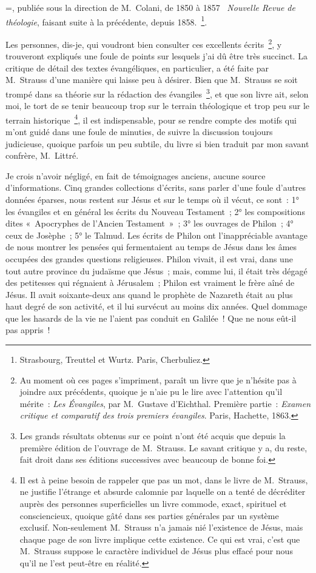 \documentclass[french,twoside]{book} %
\newcommand{\biblitem}[1]{{\noindent\hangindent=\parindent   #1\par}}
\begin{document}
\biblitem{{\itshape Revue de théologie et de philosophie chrétienne}, publiée sous la direction de M. Colani, de 1850 à 1857  {\itshape Nouvelle Revue de théologie}, faisant suite à la précédente, depuis 1858. \footnote{Strasbourg, Treuttel et Wurtz. Paris, Cherbuliez.}.}
\noindent Les personnes, dis-je, qui voudront bien consulter ces excellents écrits \footnote{ Au moment où ces pages s’impriment, paraît un livre que je n’hésite pas à joindre aux précédents, quoique je n’aie pu le lire avec l’attention qu’il mérite : {\itshape Les Évangiles}, par M. Gustave d’Eichthal. Première partie : {\itshape Examen critique et comparatif des trois premiers évangiles}. Paris, Hachette, 1863.}, y trouveront expliqués une foule de points sur lesquels j’ai dû être très succinct. La critique de détail des textes évangéliques, en particulier, a été faite par M. Strauss d’une manière qui laisse peu à désirer. Bien que M. Strauss se soit trompé dans sa théorie sur la rédaction des évangiles \footnote{Les grands résultats obtenus sur ce point n’ont été acquis que depuis la première édition de l’ouvrage de M. Strauss. Le savant critique y a, du reste, fait droit dans ses éditions successives avec beaucoup de bonne foi.}, et que son livre ait, selon moi, le tort de se tenir beaucoup trop sur le terrain théologique et trop peu sur le terrain historique \footnote{Il est à peine besoin de rappeler que pas un mot, dans le livre de M. Strauss, ne justifie l’étrange et absurde calomnie par laquelle on a tenté de décréditer auprès des personnes superficielles un livre commode, exact, spirituel et consciencieux, quoique gâté dans ses parties générales par un système exclusif. Non-seulement M. Strauss n’a jamais nié l’existence de Jésus, mais chaque page de son livre implique cette existence. Ce qui est vrai, c’est que M. Strauss suppose le caractère individuel de Jésus plus effacé pour nous qu’il ne l’est peut-être en réalité.}, il est indispensable, pour se rendre compte des motifs qui m’ont guidé dans une foule de minuties, de suivre la discussion toujours judicieuse, quoique parfois un peu subtile, du livre si bien traduit par mon savant confrère, M. Littré.\par
Je crois n’avoir négligé, en fait de témoignages anciens, aucune source d’informations. Cinq grandes collections d’écrits, sans parler d’une foule d’autres données éparses, nous restent sur Jésus et sur le temps où il vécut, ce sont : 1° les évangiles et en général les écrits du Nouveau Testament ; 2° les compositions dites « Apocryphes de l’Ancien Testament » ; 3° les ouvrages de Philon ; 4° ceux de Josèphe ; 5° le Talmud. Les écrits de Philon ont l’inappréciable avantage de nous montrer les pensées qui fermentaient au temps de Jésus dans les âmes occupées des grandes questions religieuses. Philon vivait, il est vrai, dans une tout autre province du judaïsme que Jésus ; mais, comme lui, il était très dégagé des petitesses qui régnaient à Jérusalem ; Philon est vraiment le frère aîné de Jésus. Il avait soixante-deux ans quand le prophète de Nazareth était au plus haut degré de son activité, et il lui survécut au moins dix années. Quel dommage que les hasards de la vie ne l’aient pas conduit en Galilée ! Que ne nous eût-il pas appris !\par
\end{document}
